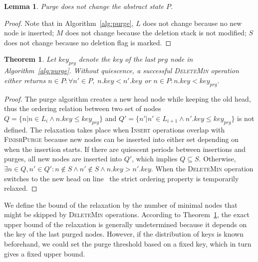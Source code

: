 \documentclass[10pt,journal,letterpaper,compsoc]{IEEEtran}
\newtheorem{theorem}{Theorem}
\newtheorem{lemma}{Lemma}
\begin{document}
\begin{lemma}
    Purge does not change the abstract state $P$.
\end{lemma}
\begin{proof}
    Note that in Algorithm~\ref{alg:purge}, $L$ does not change because no new node is inserted; $M$ does not change because the deletion stack is not modified; $S$ does not change because no deletion flag is marked.
\end{proof}

\begin{theorem} \label{th:bound}
    Let $key_{prg}$ denote the key of the last $prg$ node in Algorithm~\ref{alg:purge}.
    Without quiescence, a successful \textsc{DeleteMin} operation either returns $n \in P : \forall n' \in P,\;n.key < n'.key$ or $n \in P : n.key < key_{prg}$.
\end{theorem}
\begin{proof}
    The purge algorithm creates a new head node while keeping the old head, thus the ordering relation between two set of nodes $Q=\{n|n\in L_i \land n.key \le key_{prg}\}$ and $Q'=\{n'|n' \in L_{i+1} \land n'.key \le key_{prg}\}$ is not defined.
The relaxation takes place when \textsc{Insert} operations overlap with \textsc{FinishPurge} because new nodes can be inserted into either set depending on when the insertion starts.
If there are quiescent periods between insertions and purges, all new nodes are inserted into $Q'$, which implies $Q \subseteq S$.
Otherwise, $\exists n\in Q, n' \in Q' : n \notin S \land n' \notin S \land n.key > n'.key$.
When the \textsc{DeleteMin} operation switches to the new head on line~ the strict ordering property is temporarily relaxed.
\end{proof}

We define the bound of the relaxation by the number of minimal nodes that might be skipped by \textsc{DeleteMin} operations.
According to Theorem~\ref{th:bound}, the exact upper bound of the relaxation is generally undetermined because it depends on the key of the last purged nodes. 
However, if the distribution of keys is known beforehand, we could set the purge threshold based on a fixed key, which in turn gives a fixed upper bound.
\end{document}
